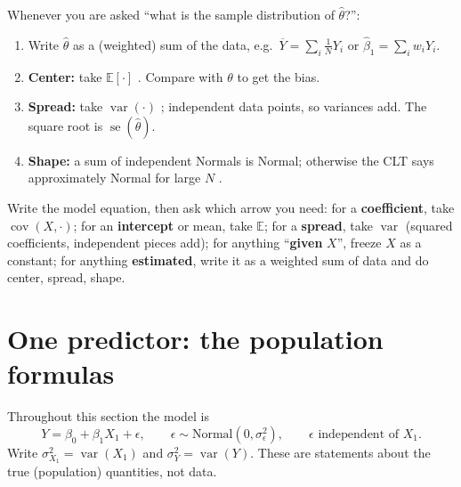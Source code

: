 \documentclass[11pt]{article}
\newcommand{\E}{\mathbb{E}}
\newcommand{\Var}{\operatorname{var}}
\newcommand{\Cov}{\operatorname{cov}}
\newcommand{\se}{\operatorname{se}}
\newcommand{\Norm}{\text{Normal}}
\newcommand{\Ybar}{\overline{Y}}
\newcommand{\mv}[1]{\tcbox[on line, colback=methodclr, colframe=methodclr, coltext=white, boxsep=0pt,
  left=2pt, right=2pt, top=1pt, bottom=1pt, arc=1.5pt]{\sffamily\scriptsize\bfseries M#1}}
\begin{document}
\begin{keybox}[title={The general recipe for any sample distribution}]
Whenever you are asked ``what is the sample distribution of $\hat\theta$?'':
\begin{enumerate}[leftmargin=*,itemsep=1pt,label=\arabic*.]
\item Write $\hat\theta$ as a (weighted) sum of the data, e.g.\ $\Ybar=\sum_i\frac1NY_i$ or $\hat\beta_1=\sum_i w_iY_i$.
\item \textbf{Center:} take $\E[\cdot]$ \mv{2}. Compare with $\theta$ to get the bias.
\item \textbf{Spread:} take $\Var(\cdot)$ \mv{4}; independent data points, so variances add. The square root is $\se(\hat\theta)$.
\item \textbf{Shape:} a sum of independent Normals is Normal; otherwise the CLT says approximately Normal for large $N$ \mv{7}.
\end{enumerate}
\end{keybox}

\begin{tipbox}[title={If you blank on the exam}]
Write the model equation, then ask which arrow you need: for a \textbf{coefficient}, take $\Cov(X,\cdot)$; for an \textbf{intercept} or mean, take
$\E$; for a \textbf{spread}, take $\Var$ (squared coefficients, independent pieces add); for anything ``\textbf{given} $X$'', freeze $X$ as a constant;
for anything \textbf{estimated}, write it as a weighted sum of data and do center, spread, shape.
\end{tipbox}

\clearpage
\section{One predictor: the population formulas}\label{sec:onepred}
Throughout this section the model is
\[
Y=\beta_0+\beta_1X_1+\epsilon,\qquad \epsilon\sim\Norm(0,\sigma_\epsilon^2),\qquad \epsilon \text{ independent of } X_1 .
\]
Write $\sigma_{X_1}^2=\Var(X_1)$ and $\sigma_Y^2=\Var(Y)$. These are statements about the true (population) quantities, not data.
\end{document}

